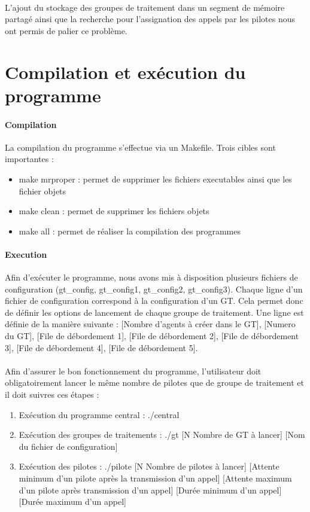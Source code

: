 \documentclass{report}
\begin{document}
		\paragraph{}
			L'ajout du stockage des groupes de traitement dans un segment de mémoire partagé ainsi que la recherche pour l'assignation des appels par les pilotes nous ont permis de palier ce problème.

	\section{Compilation et exécution du programme}
		\paragraph{Compilation}
			La compilation du programme s'effectue via un Makefile. Trois cibles sont importantes :
			\begin{itemize}
				\item make mrproper : permet de supprimer les fichiers executables ainsi que les fichier objets
				\item make clean : permet de supprimer les fichiers objets
				\item make all : permet de réaliser la compilation des programmes
			\end{itemize}

		\paragraph{Execution}
			Afin d'exécuter le programme, nous avons mis à disposition plusieurs fichiers de configuration (gt\_config, gt\_config1, gt\_config2, gt\_config3). Chaque ligne d'un fichier de configuration correspond à la configuration d'un GT. Cela permet donc de définir les options de lancement de chaque groupe de traitement. Une ligne est définie de la manière suivante : [Nombre d'agents à créer dans le GT], [Numero du GT], [File de débordement 1], [File de débordement 2], [File de débordement 3], [File de débordement 4], [File de débordement 5].
		\paragraph{}
			Afin d'assurer le bon fonctionnement du programme, l'utilisateur doit obligatoirement lancer le même nombre de pilotes que de groupe de traitement et il doit suivres ces étapes :
			\begin{enumerate}
				\item Exécution du programme central : ./central
				\item Exécution des groupes de traitements : ./gt [N Nombre de GT à lancer] [Nom du fichier de configuration]
				\item Exécution des pilotes : ./pilote [N Nombre de pilotes à lancer] [Attente minimum d'un pilote après la transmission d'un appel] [Attente maximum d'un pilote après transmission d'un appel] [Durée minimum d'un appel] [Durée maximum d'un appel]
			\end{enumerate}
\end{document}
